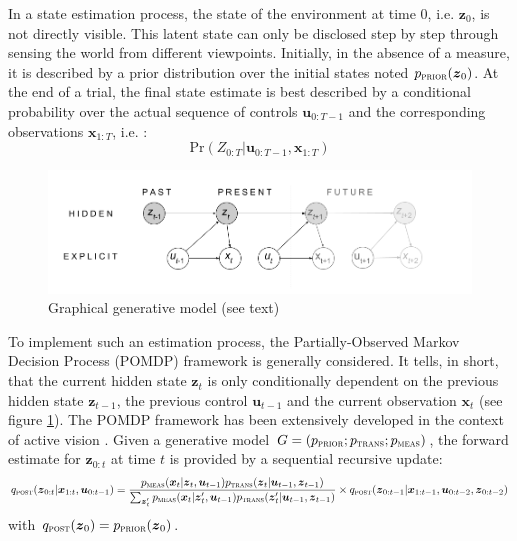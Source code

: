 \documentclass[12pt,twoside,openright]{article}
\begin{document}
In a state estimation process, the state of the environment at time 0, i.e. $\boldsymbol{z}_0$, is not directly visible. This latent state can only be disclosed step by step through sensing the world from different viewpoints. Initially, in the absence of a measure, it is described by a prior distribution over the initial states noted $p_\text{\sc prior}(\boldsymbol{z}_0)$. At the end of a trial, the final state estimate is best described by a conditional probability over the actual sequence of controls $\boldsymbol{u}_{0:T-1}$ and the corresponding observations $\boldsymbol{x}_{1:T}$, i.e. :
$$\text{Pr}(Z_{0:T}|\boldsymbol{u}_{0:T-1}, \boldsymbol{x}_{1:T})$$

\begin{figure}[t!]
	\centerline{
		\includegraphics[width = \linewidth]{img/ICLR-graphical-v2.png} 
	}
	\caption{Graphical generative model (see text)}\label{fig:pomdp}
\end{figure}


To implement such an estimation process, the Partially-Observed Markov Decision Process (POMDP) framework is generally considered. It tells, in short, that the current hidden state $\boldsymbol{z}_t$ is only conditionally dependent on the previous hidden state $\boldsymbol{z}_{t-1}$, the previous control $\boldsymbol{u}_{t-1}$ and the current observation $\boldsymbol{x}_t$ (see figure \ref{fig:pomdp}). 
The POMDP framework has been extensively developed in the context of active vision \cite{butko2010infomax,ahmad2013active,potthast2016active}.
Given a generative model $G = (p_\text{\sc prior}; p_\text{\sc trans}; p_\text{\sc meas})$, the forward estimate for $\boldsymbol{z}_{0:t}$ at time $t$ is provided by a sequential recursive update: 
$$q_\text{\sc post}(\boldsymbol{z}_{0:t}|\boldsymbol{x}_{1:t},\boldsymbol{u}_{0:t-1}) 
= \frac{p_\text{\sc meas}(\boldsymbol{x}_t|\boldsymbol{z}_t,\boldsymbol{u}_{t-1}) p_\text{\sc trans}(\boldsymbol{z}_t|\boldsymbol{u}_{t-1},\boldsymbol{z}_{t-1})}
{\sum_{\boldsymbol{z}_t'}p_\text{\sc meas}(\boldsymbol{x}_t|\boldsymbol{z}_t',\boldsymbol{u}_{t-1}) p_\text{\sc trans}(\boldsymbol{z}_t'|\boldsymbol{u}_{t-1},\boldsymbol{z}_{t-1})} \times q_\text{\sc post}(\boldsymbol{z}_{0:t-1}|\boldsymbol{x}_{1:t-1},\boldsymbol{u}_{0:t-2}, \boldsymbol{z}_{0:t-2}) \label{eq:post-pompd}$$
with $q_\text{\sc post}(\boldsymbol{z}_0) = p_\text{\sc prior}(\boldsymbol{z}_0)$.
\end{document}
